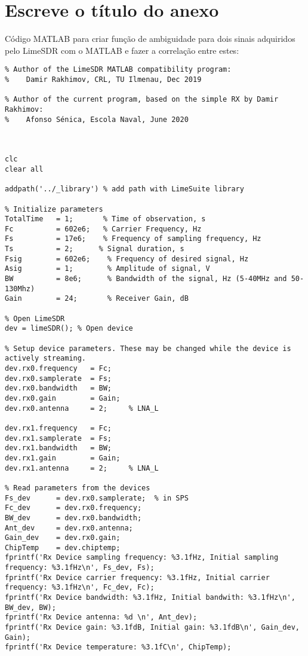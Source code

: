 
\chapter{Escreve o título do anexo} %

\label{Annex3} %

Código MATLAB para criar função de ambiguidade para dois sinais adquiridos pelo LimeSDR com o MATLAB e fazer a correlação entre estes:

\begin{verbatim}
% Author of the LimeSDR MATLAB compatibility program:
%    Damir Rakhimov, CRL, TU Ilmenau, Dec 2019

% Author of the current program, based on the simple RX by Damir Rakhimov:
%    Afonso Sénica, Escola Naval, June 2020



clc
clear all

addpath('../_library') % add path with LimeSuite library

% Initialize parameters
TotalTime   = 1;       % Time of observation, s
Fc          = 602e6;   % Carrier Frequency, Hz
Fs          = 17e6;    % Frequency of sampling frequency, Hz
Ts          = 2;      % Signal duration, s
Fsig        = 602e6;    % Frequency of desired signal, Hz
Asig        = 1;        % Amplitude of signal, V
BW          = 8e6;      % Bandwidth of the signal, Hz (5-40MHz and 50-130Mhz)
Gain        = 24;       % Receiver Gain, dB

% Open LimeSDR
dev = limeSDR(); % Open device

% Setup device parameters. These may be changed while the device is actively streaming.
dev.rx0.frequency   = Fc;
dev.rx0.samplerate  = Fs;
dev.rx0.bandwidth   = BW;
dev.rx0.gain        = Gain;
dev.rx0.antenna     = 2;     % LNA_L

dev.rx1.frequency   = Fc;
dev.rx1.samplerate  = Fs;
dev.rx1.bandwidth   = BW;
dev.rx1.gain        = Gain;
dev.rx1.antenna     = 2;     % LNA_L

% Read parameters from the devices
Fs_dev      = dev.rx0.samplerate;  % in SPS
Fc_dev      = dev.rx0.frequency;
BW_dev      = dev.rx0.bandwidth;
Ant_dev     = dev.rx0.antenna;
Gain_dev    = dev.rx0.gain;
ChipTemp    = dev.chiptemp;
fprintf('Rx Device sampling frequency: %3.1fHz, Initial sampling frequency: %3.1fHz\n', Fs_dev, Fs);
fprintf('Rx Device carrier frequency: %3.1fHz, Initial carrier frequency: %3.1fHz\n', Fc_dev, Fc);
fprintf('Rx Device bandwidth: %3.1fHz, Initial bandwith: %3.1fHz\n', BW_dev, BW);
fprintf('Rx Device antenna: %d \n', Ant_dev);
fprintf('Rx Device gain: %3.1fdB, Initial gain: %3.1fdB\n', Gain_dev, Gain);
fprintf('Rx Device temperature: %3.1fC\n', ChipTemp);


\end{verbatim}
